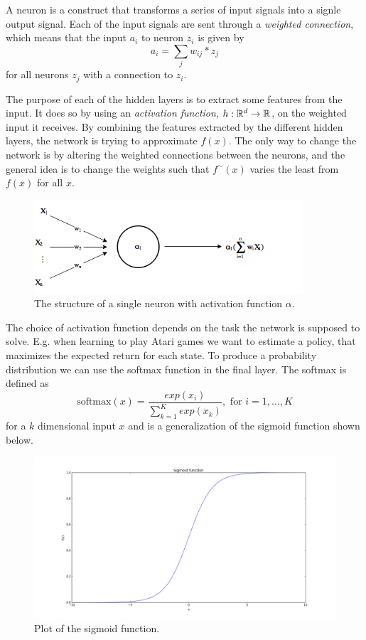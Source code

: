 \documentclass[11pt]{article}
\begin{document}
A neuron is a construct that transforms a series of input signals into a signle output signal.
Each of the input signals are sent through a \textit{weighted connection}, which means
that the input $a_i$ to neuron $z_i$ is given by
\begin{equation}
    a_i = \sum\limits_{j} w_{ij}* z_j
\end{equation}
for all neurons $z_j$ with a connection to $z_i$.

The purpose of each of the hidden layers is to extract some features from the input.
It does so by using an \textit{activation function}, $h : \mathbb{R}^d \to \mathbb{R}$, on the
weighted input it receives.
By combining the features extracted by the different hidden layers, the network
is trying to approximate $f(x)$.
The only way to change the network is by altering the weighted connections
between the neurons, and the general idea is to change the weights such that
$f^\sim(x)$ varies the least from $f(x)$ for all $x$.

\begin{figure}[!h]
    \centering
    \includegraphics[width=10cm]{include/neuron.png}
    \caption{The structure of a single neuron with activation function $\alpha$.}
    \label{fig:neuron}
\end{figure}

The choice of activation function depends on the task the
network is supposed to solve.
E.g. when learning to play Atari games we want to estimate a policy,
that maximizes the expected return for each state.
To produce a probability distribution we can use the softmax function in the
final layer.
The softmax is defined as
\begin{equation}
    \text{softmax}(x) = \frac{exp(x_i)}{\sum\limits_{k=1}^K exp(x_k)}, \text{ for } i = 1, \dots, K
\end{equation}
for a $k$ dimensional input $x$ and is a generalization of the sigmoid function
shown below.
\begin{figure}[!h]
    \centering
    \includegraphics[width=15cm]{include/sigmoid.png}
    \caption{Plot of the sigmoid function.}
    \label{fig:softmax}
\end{figure}
\end{document}
